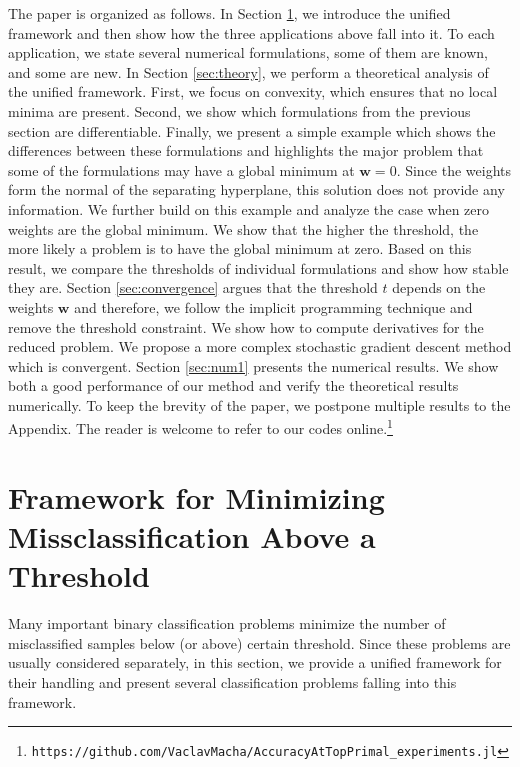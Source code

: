 \documentclass[]{interact}
\theoremstyle{plain}%
\theoremstyle{definition}
\theoremstyle{remark}
\begin{document}
The paper is organized as follows. In Section \ref{sec:framework}, we introduce the unified framework and then show how the three applications above fall into it. To each application, we state several numerical formulations, some of them are known, and some are new. In Section \ref{sec:theory}, we perform a theoretical analysis of the unified framework. First, we focus on convexity, which ensures that no local minima are present. Second, we show which formulations from the previous section are differentiable. Finally, we present a simple example which shows the differences between these formulations and highlights the major problem that some of the formulations may have a global minimum at $\bm w=0$. Since the weights form the normal of the separating hyperplane, this solution does not provide any information. We further build on this example and analyze the case when zero weights are the global minimum. We show that the higher the threshold, the more likely a problem is to have the global minimum at zero. Based on this result, we compare the thresholds of individual formulations and show how stable they are. Section \ref{sec:convergence} argues that the threshold $t$ depends on the weights $\bm w$ and therefore, we follow the implicit programming technique and remove the threshold constraint. We show how to compute derivatives for the reduced problem. We propose a more complex stochastic gradient descent method which is convergent. Section \ref{sec:num1} presents the numerical results. We show both a good performance of our method and verify the theoretical results numerically. To keep the brevity of the paper, we postpone multiple results to the Appendix. The reader is welcome to refer to our codes online.\footnote{\texttt{https://github.com/VaclavMacha/AccuracyAtTopPrimal\_experiments.jl}}





\section{Framework for Minimizing Missclassification Above a Threshold}\label{sec:framework}

Many important binary classification problems minimize the number of misclassified samples below (or above) certain threshold. Since these problems are usually considered separately, in this section, we provide a unified framework for their handling and present several classification problems falling into this framework.
\end{document}
